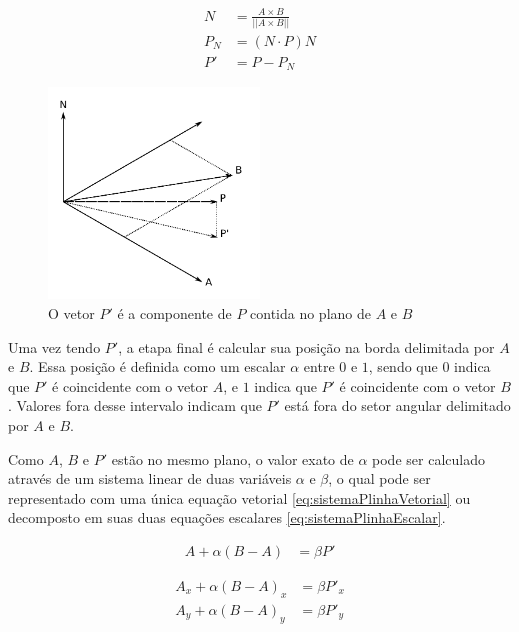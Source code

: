 \documentclass[brazil,pagestart=firstchapter]{abnt}
\begin{document}
\begin{align}
\label{eq:normal}
N   & = \frac{A \times B}{ || A \times B || }   \\
\label{eq:Pnormal}
P_N & = (N \cdot P) N                           \\
\label{eq:Plinha}
P'  & = P - P_N
\end{align}

\begin{figure}[h]
\centering
\includegraphics[width=0.5\textwidth]{img/geometria_ABCD3.pdf}
\caption{O vetor $P'$ é a componente de $P$ contida no plano de $A$ e $B$}
\label{fig:geometria_ABCD3}
\end{figure}

Uma vez tendo $P'$, a etapa final é calcular sua posição na borda delimitada
por $A$ e $B$. Essa posição é definida como um escalar $\alpha$ entre $0$ e
$1$, sendo que $0$ indica que $P'$ é coincidente com o vetor $A$, e $1$
indica que $P'$ é coincidente com o vetor $B$. Valores fora desse intervalo
indicam que $P'$ está fora do setor angular delimitado por $A$ e $B$.

Como $A$, $B$ e $P'$ estão no mesmo plano, o valor exato de $\alpha$ pode
ser calculado através de um sistema linear de duas variáveis $\alpha$ e
$\beta$, o qual pode ser representado com uma única equação vetorial
\eqref{eq:sistemaPlinhaVetorial} ou decomposto em suas duas equações
escalares \eqref{eq:sistemaPlinhaEscalar}.

\begin{align}
\label{eq:sistemaPlinhaVetorial}
A   + \alpha (B-A)   & = \beta P'
\end{align}

\begin{align}
\label{eq:sistemaPlinhaEscalar}
A_x + \alpha (B-A)_x & = \beta P'_x  \\
A_y + \alpha (B-A)_y & = \beta P'_y  \nonumber
\end{align}
\end{document}
